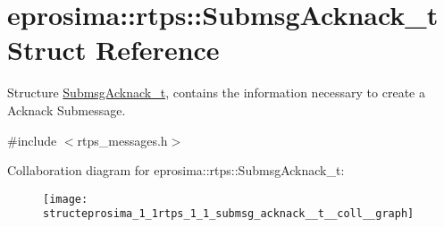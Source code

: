 \hypertarget{structeprosima_1_1rtps_1_1_submsg_acknack__t}{\section{eprosima\-:\-:rtps\-:\-:\-Submsg\-Acknack\-\_\-t \-Struct \-Reference}
\label{structeprosima_1_1rtps_1_1_submsg_acknack__t}
}


\-Structure \hyperlink{structeprosima_1_1rtps_1_1_submsg_acknack__t}{\-Submsg\-Acknack\-\_\-t}, contains the information necessary to create a \-Acknack \-Submessage.  




{\ttfamily \#include $<$rtps\-\_\-messages.\-h$>$}



\-Collaboration diagram for eprosima\-:\-:rtps\-:\-:\-Submsg\-Acknack\-\_\-t\-:\nopagebreak
\begin{figure}[H]
\begin{center}
\leavevmode
\texttt{[image: structeprosima\_1\_1rtps\_1\_1\_submsg\_acknack\_\_t\_\_coll\_\_graph]}
\end{center}
\end{figure}
